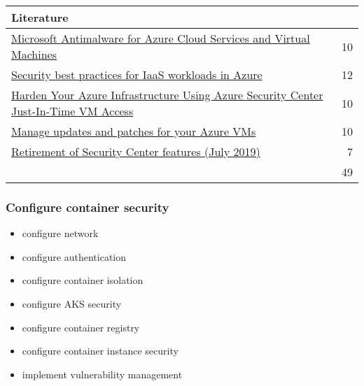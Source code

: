 \begin{tabular}{p{14cm} | r}
\textbf{Literature} & \\
\hline
\href{https://docs.microsoft.com/en-us/azure/security/fundamentals/antimalware}{Microsoft Antimalware for Azure Cloud Services and Virtual Machines} & 10 \\
\href{https://docs.microsoft.com/en-us/azure/security/fundamentals/iaas}{Security best practices for IaaS workloads in Azure} & 12 \\
\href{https://blogs.msdn.microsoft.com/mvpawardprogram/2018/01/09/just-in-time-access-azure-vms/}{Harden Your Azure Infrastructure Using Azure Security Center Just-In-Time VM Access} & 10 \\
\href{https://docs.microsoft.com/en-us/azure/automation/automation-tutorial-update-management}{Manage updates and patches for your Azure VMs} & 10 \\
\href{https://docs.microsoft.com/en-us/azure/security-center/security-center-features-retirement-july2019#menu_securityconfigurations}{Retirement of Security Center features (July 2019)} & 7 \\
\cline{2-2} 
 & 49 \\
\end{tabular}

\subsubsection{Configure container security}
\begin{itemize}
\item configure network 
\item configure authentication 
\item configure container isolation 
\item configure AKS security 
\item configure container registry 
\item configure container instance security 
\item implement vulnerability management 
\end{itemize}

